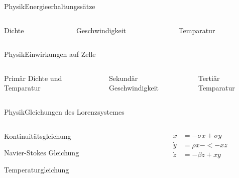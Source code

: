 \documentclass[presentation.tex]{subfiles}
\begin{document}
	\begin{frame}{Physik}{Energieerhaltungssätze}
		\begin{columns}[c]
			\begin{column}{.3\textwidth}
				Dichte
			\end{column}
			\begin{column}{.3\textwidth}
				Geschwindigkeit
			\end{column}
			\begin{column}{0.3\textwidth}
				Temparatur
			\end{column}
		\end{columns}
	\end{frame}

	\begin{frame}{Physik}{Einwirkungen auf Zelle}
		\begin{columns}[c]
			\begin{column}{.3\textwidth}
				\begin{block}{Primär}
					Dichte und Temparatur
				\end{block}
			\end{column}
			\begin{column}{.3\textwidth}
				\begin{block}{Sekundär}
					Geschwindigkeit
				\end{block}
			\end{column}
			\begin{column}{0.3\textwidth}
				\begin{block}{Tertiär}
					Temparatur
				\end{block}
			\end{column}
		\end{columns}
	\end{frame}

	\begin{frame}{Physik}{Gleichungen des Lorenzsystemes}
		\begin{columns}[c]
			\begin{column}{.5\textwidth}
				\begin{block}{Kontinuitätsgleichung}
				\end{block}
				\begin{block}{Navier-Stokes Gleichung}
				\end{block}
				\begin{block}{Temperaturgleichung}
				\end{block}
			\end{column}
			\begin{column}{.5\textwidth}
				\begin{align*}
				\dot{x} &= -\sigma x + \sigma y\\
				\dot{y} &= \rho x - <- xz\\
				\dot{z} &= -\beta z + xy\\
				\end{align*}
			\end{column}
		\end{columns}
	\end{frame}
\end{document}
